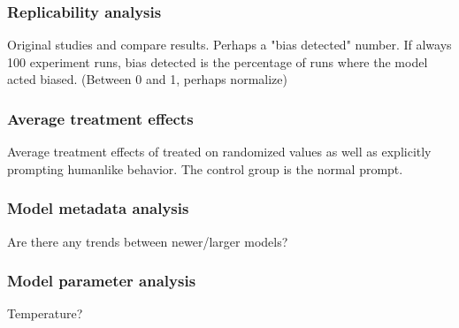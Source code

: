 \subsubsection{Replicability analysis}
Original studies and compare results. Perhaps a "bias detected" number. If always 100 experiment runs, bias detected is the percentage of runs where the model acted biased. (Between 0 and 1, perhaps normalize)

\subsubsection{Average treatment effects}
Average treatment effects of treated on randomized values as well as explicitly prompting humanlike behavior. The control group is the normal prompt.

\subsubsection{Model metadata analysis}
Are there any trends between newer/larger models?

\subsubsection{Model parameter analysis}
Temperature?